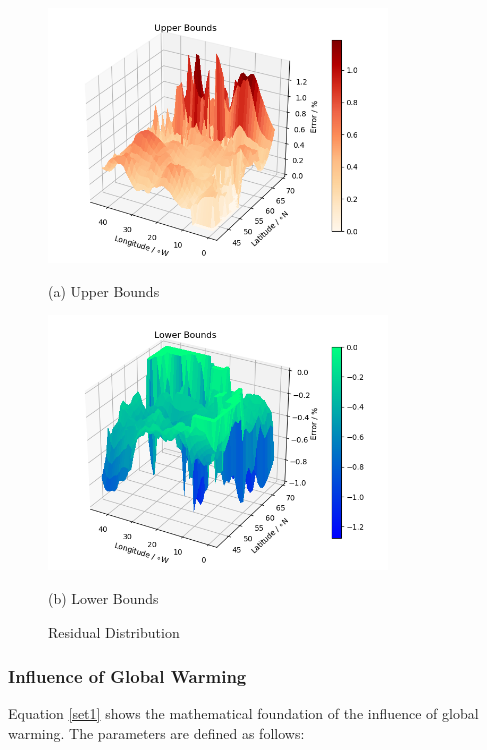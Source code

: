 \documentclass{mcmthesis}
\begin{document}
     \begin{figure}[H]
     \begin{minipage}{0.5\linewidth}
       \centerline{\includegraphics[width=9.0cm]{plots/grey_forcast_err_1_V1.png}}
       \centerline{(a) Upper Bounds}
     \end{minipage}
     \hfill
     \begin{minipage}{.5\linewidth}
       \centerline{\includegraphics[width=9.0cm]{plots/grey_forcast_err_2_V1.png}}
       \centerline{(b) Lower Bounds}
     \end{minipage}
     \caption{Residual Distribution}
     \label{figures}
     \end{figure}

\subsubsection{Influence of Global Warming}\label{S4ss2}
	Equation \ref{set1} shows the mathematical foundation of the influence of global warming. The parameters are defined as follows:
\end{document}
